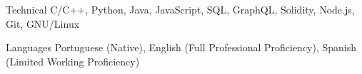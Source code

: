 
\begin{cvskills}
  \cvskill
    {Technical} %
    {C/C++, Python, Java, JavaScript, SQL, GraphQL, Solidity, Node.js, Git, GNU/Linux} %

  \cvskill
    {Languages} %
    {Portuguese (Native), English (Full Professional Proficiency), Spanish (Limited Working Proficiency)} %

\end{cvskills}
